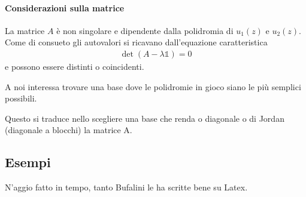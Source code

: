 \paragraph{Considerazioni sulla matrice}  

La matrice $A$ è non singolare e dipendente dalla polidromia di $u_1(z)$ e $u_2(z)$. Come di consueto gli autovalori si ricavano dall'equazione caratteristica
\begin{align}
	\det(A -\lambda \mathbb{1}) = 0
\end{align}
e possono essere distinti o coincidenti.

A noi interessa trovare una base dove le polidromie in gioco siano le più semplici possibili. 

Questo si traduce nello scegliere una base che renda o diagonale o di Jordan (diagonale a blocchi) la matrice A.
\newpage

\subsection{Esempi}
N'aggio fatto in tempo, tanto Bufalini le ha scritte bene su Latex.